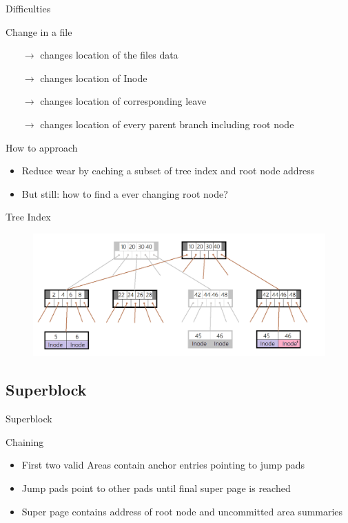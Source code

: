 \documentclass[
	,footlinenumber
	,navline=true
	,footlineauthor
	,ngerman
	]{beamer}
\begin{document}
\begin{frame}{Difficulties}
	\begin{block}{Change in a file}
		\begin{itemize}
			\item[$\rightarrow$] changes location of the files data
			\item[$\rightarrow$] changes location of Inode
			\item[$\rightarrow$] changes location of corresponding leave
			\item[$\rightarrow$] changes location of every parent branch including root node
		\end{itemize}
	\end{block}
	\begin{block}{How to approach}
		\begin{itemize}
			\item Reduce wear by caching a subset of tree index and root node address
			\item But still: how to find a ever changing root node?
		\end{itemize}
	\end{block}
\end{frame}


\begin{frame}{Tree Index}
	\begin{figure}[H]
		\centering
		\includegraphics[width=\textwidth]{../images/btree_2.png}
	\end{figure}
\end{frame}

\subsection{Superblock}
\begin{frame}{Superblock}
	\begin{block}{Chaining}
		\begin{itemize}
			\item First two valid Areas contain anchor entries pointing to jump pads
			\item Jump pads point to other pads until final super page is reached
			\item Super page contains address of root node and uncommitted area summaries
		\end{itemize}
	\end{block}
\end{frame}
\end{document}
